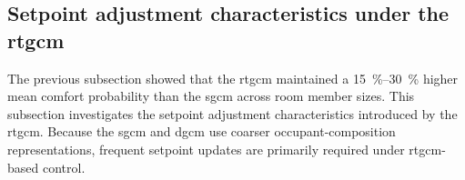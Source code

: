 


\subsection{Setpoint adjustment characteristics under the \ac{rtgcm}}
\label{subsec:controleffect}
The previous subsection showed that the \ac{rtgcm} maintained a \qtyrange{15}{30}{\percent} higher mean comfort probability than the \ac{sgcm} across room member sizes.
This subsection investigates the setpoint adjustment characteristics introduced by the \ac{rtgcm}.
Because the \ac{sgcm} and \ac{dgcm} use coarser occupant-composition representations, frequent setpoint updates are primarily required under \ac{rtgcm}-based control.

